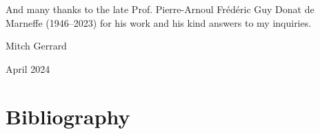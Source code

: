\documentclass[openany,nobib]{tufte-book}
\begin{document}
And many thanks to the late Prof. Pierre-Arnoul Frédéric Guy Donat de Marneffe
(1946--2023) for his work and his kind answers to my inquiries.

\bigskip

\hfill Mitch Gerrard

\hfill April 2024


\backmatter

\chapter{Bibliography}
\printbibliography[heading=none]
\end{document}
